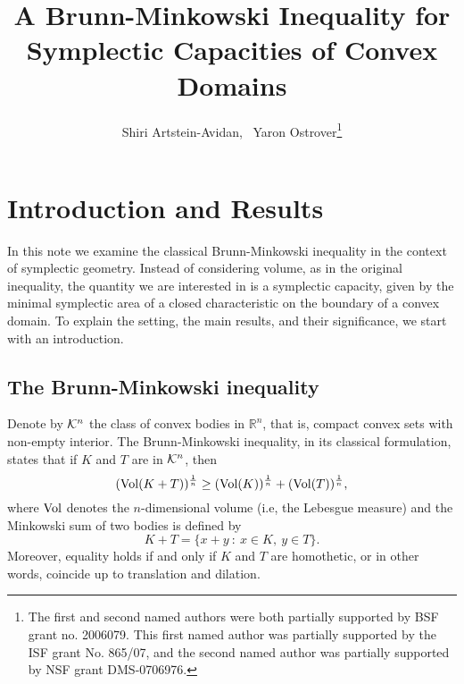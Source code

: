 \documentclass[12pt]{article}
\begin{document}
\title {A Brunn-Minkowski Inequality for Symplectic Capacities of Convex
Domains}
\author{Shiri Artstein-Avidan, \ Yaron Ostrover\thanks{The first and
second named authors were both partially supported by BSF grant
no. 2006079. \hfill %
This first named author was partially supported by the ISF grant No.
865/07, and the second named author was partially supported by NSF
grant DMS-0706976.}} \maketitle {}



\section{Introduction and Results}



In this note we examine the classical Brunn-Minkowski inequality in
the context of symplectic geometry. Instead of considering volume,
as in the original inequality, the quantity we are interested in is
a symplectic capacity, given by the minimal symplectic area of a
closed characteristic on the boundary of a convex domain. To explain
the setting, the main results, and their significance, we start with
an introduction.

\subsection{The Brunn-Minkowski inequality} \label{BM-section}

Denote by ${\cal K}^n$ the class of convex bodies in ${\mathbb
R}^n$, that is, compact convex sets with non-empty interior. The
Brunn-Minkowski inequality, in its classical formulation, states
that if $K$ and $T$ are in ${\cal K}^n$, then
\[  ({\rm Vol}( K + T)
)^{\frac 1 n} \geq ({\rm Vol}(K))^{\frac 1 n} + ({\rm
Vol}(T))^{\frac 1 n},\] where ${\rm Vol}$ denotes the
$n$-dimensional volume (i.e, the Lebesgue measure) and the
Minkowski sum of two bodies is defined by
$$ K + T = \{  x + y \ : \ x \in K, \ y\in T \}.$$
Moreover, equality holds if and only if $K$ and $T$ are homothetic,
or in other words, coincide up to translation and dilation.
\end{document}
